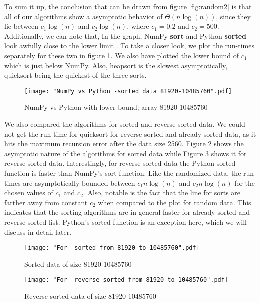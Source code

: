 \documentclass[sigconf, nonacm, natbib, screen, balance=False]{acmart}
\begin{document}
To sum it up, the conclusion that can be drawn from figure \ref{fig:random2} is that all of our algorithms show a asymptotic behavior of $\Theta \left(n \log\left(n\right)\right)$, since they lie between $c_1 \log\left(n\right)$ and $c_2 \log\left(n\right)$, where $c_1=0.2$ and $c_2=500$. \newline
Additionally, we can note that, In the graph, NumPy \textbf{sort} and Python \textbf{sorted} look awfully close to the lower limit . To take a closer look, we plot the run-times separately for these two in  figure \ref{fig:NumPyvsPython}. We also have plotted the lower bound of $c_1$ which is just below NumPy. Also, heapsort is the slowest asymptotically, quicksort being the quickest of the three sorts.

\begin{figure}[ht]
\texttt{[image: "NumPy vs Python -sorted data 81920-10485760".pdf]}
    \caption{NumPy vs Python with lower bound; array 81920-10485760 }
    \label{fig:NumPyvsPython}
\end{figure}

We also compared the algorithms for sorted and reverse sorted data. We could not get the run-time for quicksort for reverse sorted and already sorted data, as it hits the maximum recursion error after the data size 2560. Figure \ref{fig:sorted1} shows the asymptotic nature of the algorithms for sorted data while Figure \ref{fig:rsorted1} shows it for reverse sorted data. \newline
Interestingly, for reverse sorted data the Python sorted function is faster than NumPy's sort function. Like the randomized data, the run-times are asymptotically bounded between $c_1 n \log\left(n\right)$  and $c_2 n \log\left(n\right)$ for the chosen values of $c_1$ and $c_2$.\newline
Also, notable is the fact that the line for sorts are farther away from constant $c_2$ when compared to the plot for random data. This indicates that the sorting algorithms are in general faster for already sorted and reverse-sorted list. Python's sorted function is an exception here, which we will discuss in detail later.

\begin{figure}[ht]
\texttt{[image: "For -sorted from-81920 to-10485760".pdf]}
    \caption{Sorted data of size 81920-10485760 }
    \label{fig:sorted1}
\end{figure}

\begin{figure}[ht]
\texttt{[image: "For -reverse\_sorted from-81920 to-10485760".pdf]}
    \caption{Reverse sorted data of size 81920-10485760 }
    \label{fig:rsorted1}
\end{figure}
\end{document}
